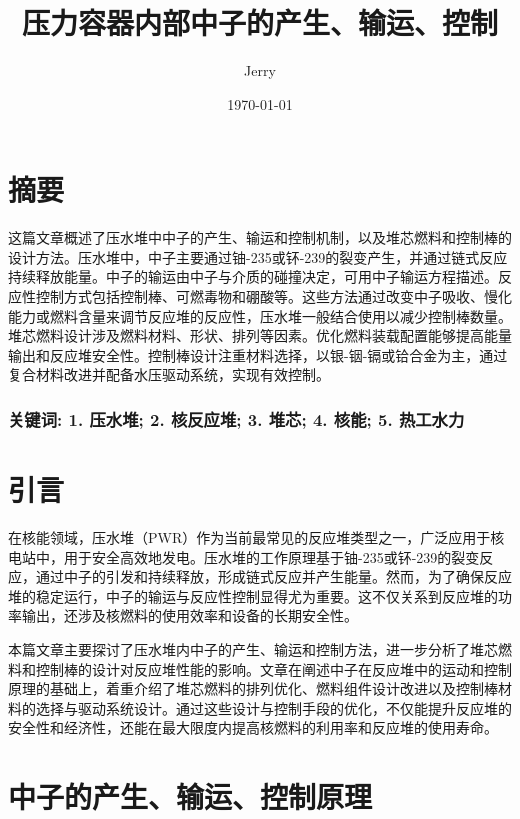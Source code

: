 \documentclass{article}
\title{\bf\huge 压力容器内部中子的产生、输运、控制}
\author{Jerry}
\date{\today}
\begin{document}
\fancyfoot[C]{\thepage}

\maketitle

\section*{摘要}

这篇文章概述了压水堆中中子的产生、输运和控制机制，以及堆芯燃料和控制棒的设计方法。压水堆中，中子主要通过铀-235或钚-239的裂变产生，并通过链式反应持续释放能量。中子的输运由中子与介质的碰撞决定，可用中子输运方程描述。反应性控制方式包括控制棒、可燃毒物和硼酸等。这些方法通过改变中子吸收、慢化能力或燃料含量来调节反应堆的反应性，压水堆一般结合使用以减少控制棒数量。堆芯燃料设计涉及燃料材料、形状、排列等因素。优化燃料装载配置能够提高能量输出和反应堆安全性。控制棒设计注重材料选择，以银-铟-镉或铪合金为主，通过复合材料改进并配备水压驱动系统，实现有效控制。

\subsubsection*{关键词: 1. 压水堆; 2. 核反应堆; 3. 堆芯; 4. 核能; 5. 热工水力}

\section{引言}

在核能领域，压水堆（PWR）作为当前最常见的反应堆类型之一，广泛应用于核电站中，用于安全高效地发电。压水堆的工作原理基于铀-235或钚-239的裂变反应，通过中子的引发和持续释放，形成链式反应并产生能量。然而，为了确保反应堆的稳定运行，中子的输运与反应性控制显得尤为重要。这不仅关系到反应堆的功率输出，还涉及核燃料的使用效率和设备的长期安全性。

本篇文章主要探讨了压水堆内中子的产生、输运和控制方法，进一步分析了堆芯燃料和控制棒的设计对反应堆性能的影响。文章在阐述中子在反应堆中的运动和控制原理的基础上，着重介绍了堆芯燃料的排列优化、燃料组件设计改进以及控制棒材料的选择与驱动系统设计。通过这些设计与控制手段的优化，不仅能提升反应堆的安全性和经济性，还能在最大限度内提高核燃料的利用率和反应堆的使用寿命。

\section{中子的产生、输运、控制原理}
\end{document}
